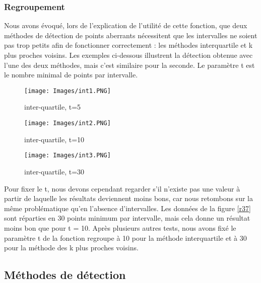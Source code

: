 \documentclass[a4paper,12pt]{article} %
\begin{document}
            
              \subsubsection{Regroupement}
            
            
                 Nous avons évoqué, lors de l'explication de l'utilité de cette fonction, que deux méthodes de détection de points aberrants nécessitent que les intervalles ne soient pas trop petits afin de fonctionner correctement : les méthodes interquartile et k plus proches voisins. Les exemples ci-dessous illustrent la détection obtenue avec l'une des deux méthodes, mais c'est similaire pour la seconde. Le paramètre t est le nombre minimal de points par intervalle.
                 \begin{figure}[H] %
                \texttt{[image: Images/int1.PNG]} %
                \caption{inter-quartile, t=5} %
                \label{m15} %
                \endminipage
                \texttt{[image: Images/int2.PNG]}  
                \caption{inter-quartile, t=10}
                \label{m5}
                \endminipage
                 \texttt{[image: Images/int3.PNG]} %
                \caption{\label{r37}inter-quartile, t=30} 
                \label{m5}
                \endminipage
                \end{figure}
                Pour fixer le t, nous devons cependant regarder s'il n'existe pas une valeur à partir de laquelle les résultats deviennent moins bons, car nous retombons sur la même problématique qu'en l'absence d'intervalles. Les données de la figure \ref{r37} sont réparties en 30 points minimum par intervalle, mais cela donne un résultat moins bon que pour t = 10.
                Après plusieurs autres tests, nous avons fixé le paramètre t de la fonction regroupe à 10 pour la méthode interquartile et à 30 pour la méthode des k plus proches voisins.
                
        \subsection{Méthodes de détection}
        
\end{document}
